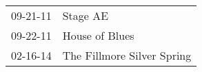 \begin{supertabular}{p{0.25\columnwidth}p{0.75\columnwidth}}
 09-21-11 &                    Stage AE \\
 09-22-11 &              House of Blues \\
 02-16-14 &  The Fillmore Silver Spring \\
\end{supertabular}
